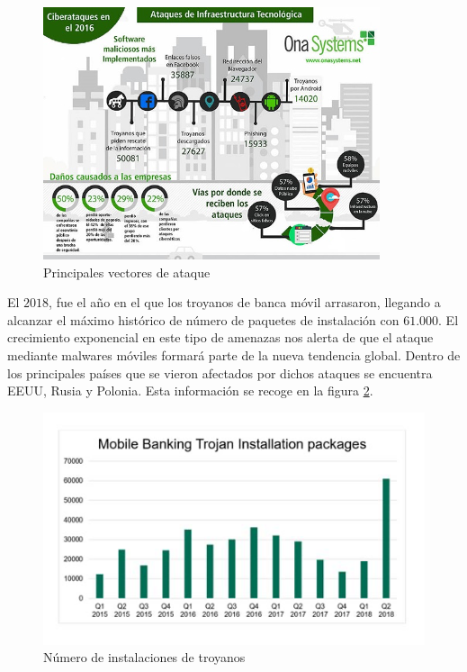 \documentclass[12pt]{article}
\begin{document}
            \begin{figure}
                \centering
                \includegraphics[width=\linewidth]{atk_vec.png}
                \caption{Principales vectores de ataque}
                \label{f:atk_vec}
            \end{figure}

            El $2018$, fue el año en el que los troyanos de banca móvil arrasaron, llegando a alcanzar el máximo histórico de número de paquetes de instalación con $61.000$. El crecimiento exponencial en este tipo de amenazas nos alerta de que el ataque mediante malwares móviles formará parte de la nueva tendencia global. Dentro de los principales países que se vieron afectados por dichos ataques se encuentra EEUU, Rusia y Polonia. Esta información se recoge en la figura \ref{f:troj_installs}.

            \begin{figure}
                \centering
                \includegraphics[width=\linewidth]{troj_installs.png}
                \caption{Número de instalaciones de troyanos}
                \label{f:troj_installs}
            \end{figure}
\end{document}
